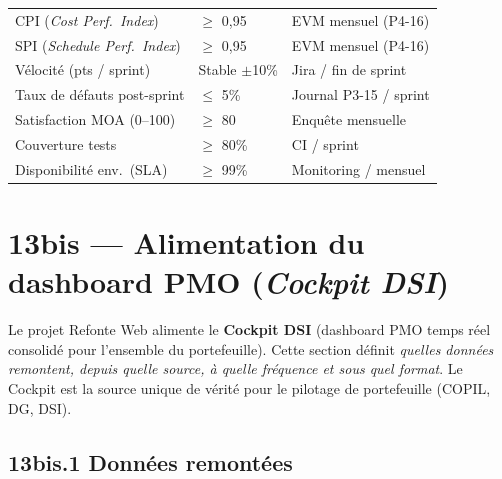 \documentclass[11pt,a4paper,oneside]{report}
\begin{document}
\renewcommand{\arraystretch}{1.3}
\begin{tabularx}{\textwidth}{L{4cm} C{2.5cm} Y}
\toprule
{} &  &  \\
\midrule
CPI (\textit{Cost Perf.\ Index})  & $\geq$ 0,95  & EVM mensuel (P4-16) \\
SPI (\textit{Schedule Perf.\ Index}) & $\geq$ 0,95  & EVM mensuel (P4-16) \\
Vélocité (pts / sprint)           & Stable $\pm$10\% & Jira / fin de sprint \\
Taux de défauts post-sprint       & $\leq$ 5\% & Journal P3-15 / sprint \\
Satisfaction MOA (0–100)          & $\geq$ 80   & Enquête mensuelle \\
Couverture tests                  & $\geq$ 80\% & CI / sprint \\
Disponibilité env.\ (SLA)         & $\geq$ 99\% & Monitoring / mensuel \\
\bottomrule
\end{tabularx}

\section*{13bis — Alimentation du dashboard PMO (\textit{Cockpit DSI})}

Le projet Refonte Web alimente le \textbf{Cockpit DSI} (dashboard PMO temps réel consolidé
pour l'ensemble du portefeuille). Cette section définit \textit{quelles données remontent,
depuis quelle source, à quelle fréquence et sous quel format}. Le Cockpit est la source
unique de vérité pour le pilotage de portefeuille (COPIL, DG, DSI).

\subsection*{13bis.1 Données remontées}
\end{document}

